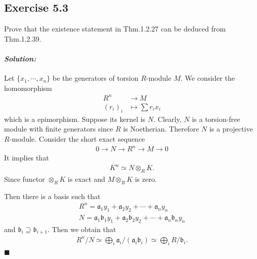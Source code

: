 \documentclass[12pt, a4paper]{article}
\renewcommand{\a}{\mathfrak{a}}
\renewcommand{\b}{\mathfrak{b}}
\newenvironment{solution}
  {\paragraph{\textit{Solution:}}\par\medskip}
  {\hfill$\blacksquare$\vspace{0.1cm}}
\begin{document}
\subsection*{Exercise 5.3}
Prove that the existence statement in Thm.1.2.27 can be deduced from Thm.1.2.39.
\begin{solution}
    Let $\{x_1,\cdots,x_n\}$ be the generators of torsion $R$-module $M$. We consider the homomorphism 
    \begin{align*}
        R^{n} &\to M \\
        (r_i)_i&\mapsto \sum r_ix_i
    \end{align*}
    which is a epimorphism. Suppose its kernel is $N$. Clearly, $N$ is a torsion-free module with finite generators since $R$ is Noetherian. Therefore $N$ is a projective $R$-module.
    Consider the short exact sequence 
    \begin{align*}
        0\to N \to R^n \to M \to 0
    \end{align*}
    It implies that 
    \begin{align*}
        K^n \simeq N \otimes_R K.
    \end{align*}
    Since functor $\otimes_R K$ is exact and $M\otimes_R K$ is zero.

    Then there is a basis such that 
    \begin{align*}
        R^n = \a_1y_1 +\a_2y_2 +\cdots+ \a_ny_n\\
        N = \a_1\b_1y_1+\a_2\b_2y_2+\cdots + \a_n\b_ny_n
    \end{align*}
    and $\b_i\supseteq \b_{i+1}$.
    Then we obtain that 
    \begin{align*}
        R^n/N \simeq \bigoplus_i \a_i/(\a_i\b_i) \simeq  \bigoplus_i R/\b_i.
    \end{align*}
\end{solution}
\end{document}
